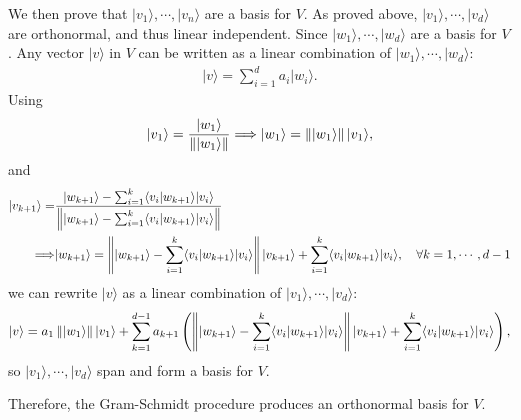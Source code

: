 \documentclass[en]{sol-man}
\begin{document}
\begin{pf}
    We then prove that $\lvert v_1\rangle,\cdots,\lvert v_n\rangle$ are a basis for $V$.
    As proved above, $\lvert v_1\rangle,\cdots,\lvert v_d\rangle$ are orthonormal, and thus linear independent. Since $\lvert w_1\rangle,\cdots,\lvert w_d\rangle$ are a basis for $V$. Any vector $\lvert v\rangle$ in $V$ can be written as a linear combination of $\lvert w_1\rangle,\cdots,\lvert w_d\rangle$:
    \begin{align}
        \lvert v\rangle=\sum_{i=1}^da_i\lvert w_i\rangle.
    \end{align}
    Using
    \begin{align}
        \label{E2.8-w1-v1}
        \lvert v_1\rangle=\frac{\lvert w_1\rangle}{\left\lVert\lvert w_1\rangle\right\rVert}\Longrightarrow \lvert w_1\rangle=\left\lVert\lvert w_1\rangle\right\rVert\lvert v_1\rangle,\\
    \end{align}
    and
    \begin{align}
        \label{E2.8-w-v}
        \notag\lvert v_{k+1}\rangle=&\frac{\lvert w_{k+1}\rangle-\sum_{i=1}^k\langle v_i\vert w_{k+1}\rangle\lvert v_i\rangle}{\left\lVert\lvert w_{k+1}\rangle-\sum_{i=1}^k\langle v_i\vert w_{k+1}\rangle\lvert v_i\rangle\right\rVert}\\
        \Longrightarrow&\lvert w_{k+1}\rangle=\left\lVert\lvert w_{k+1}\rangle-\sum_{i=1}^k\langle v_i\vert w_{k+1}\rangle\lvert v_i\rangle\right\rVert\lvert v_{k+1}\rangle+\sum_{i=1}^k\langle v_i\vert w_{k+1}\rangle\lvert v_i\rangle,\quad\forall k=1,\cdots,d-1
    \end{align}
    we can rewrite $\lvert v\rangle$ as a linear combination of $\lvert v_1\rangle,\cdots,\lvert v_d\rangle$:
    \begin{align}
        \lvert v\rangle=a_1\left\lVert\lvert w_1\rangle\right\rVert\lvert v_1\rangle+\sum_{k=1}^{d-1}a_{k+1}\left(\left\lVert\lvert w_{k+1}\rangle-\sum_{i=1}^k\langle v_i\vert w_{k+1}\rangle\lvert v_i\rangle\right\rVert\lvert v_{k+1}\rangle+\sum_{i=1}^k\langle v_i\vert w_{k+1}\rangle\lvert v_i\rangle\right),
    \end{align}
    so $\lvert v_1\rangle,\cdots,\lvert v_d\rangle$ span and form a basis for $V$.

    Therefore, the Gram-Schmidt procedure produces an orthonormal basis for $V$.
\end{pf}
\end{document}
